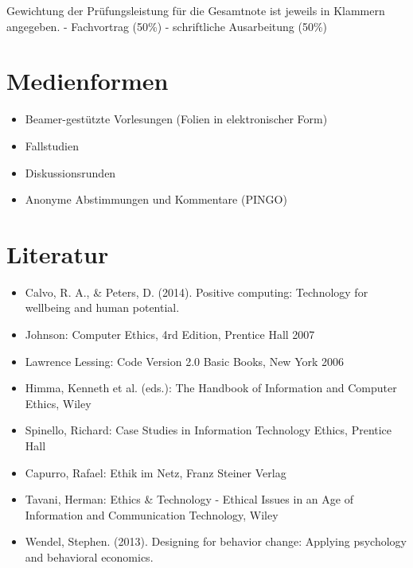 Gewichtung der Prüfungsleistung für die Gesamtnote ist jeweils in
Klammern angegeben. - Fachvortrag (50\%) - schriftliche Ausarbeitung
(50\%)

\section*{Medienformen\label{/mi-2017/modulbeschreibungen-master/MA_All_Computerethik}}\label{medienformenpathlabelmi-2017modulbeschreibungen-mastermaux5fallux5fcomputerethik}

\begin{itemize}
\tightlist
\item
  Beamer-gestützte Vorlesungen (Folien in elektronischer Form)
\item
  Fallstudien
\item
  Diskussionsrunden
\item
  Anonyme Abstimmungen und Kommentare (PINGO)
\end{itemize}

\section*{Literatur\label{/mi-2017/modulbeschreibungen-master/MA_All_Computerethik}}\label{literaturpathlabelmi-2017modulbeschreibungen-mastermaux5fallux5fcomputerethik}

\begin{itemize}
\tightlist
\item
  Calvo, R. A., \& Peters, D. (2014). Positive computing: Technology for
  wellbeing and human potential.
\item
  Johnson: Computer Ethics, 4rd Edition, Prentice Hall 2007
\item
  Lawrence Lessing: Code Version 2.0 Basic Books, New York 2006
\item
  Himma, Kenneth et al. (eds.): The Handbook of Information and Computer
  Ethics, Wiley
\item
  Spinello, Richard: Case Studies in Information Technology Ethics,
  Prentice Hall
\item
  Capurro, Rafael: Ethik im Netz, Franz Steiner Verlag
\item
  Tavani, Herman: Ethics \& Technology - Ethical Issues in an Age of
  Information and Communication Technology, Wiley
\item
  Wendel, Stephen. (2013). Designing for behavior change: Applying
  psychology and behavioral economics.
\end{itemize}

